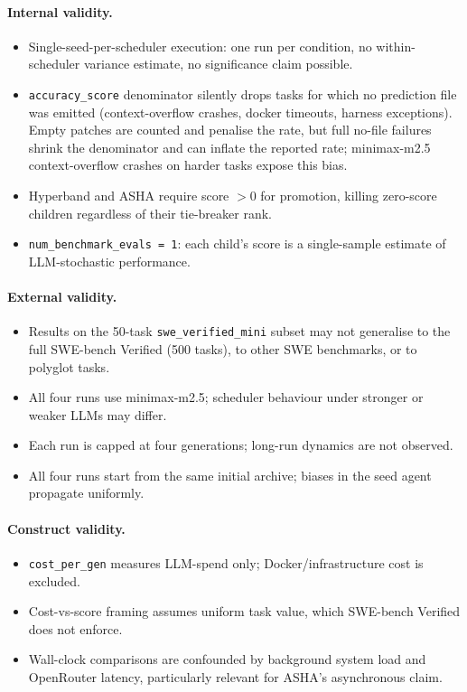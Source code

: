 \paragraph{Internal validity.}
\begin{itemize}
  \item Single-seed-per-scheduler execution: one run per condition, no
    within-scheduler variance estimate, no significance claim possible.
  \item \texttt{accuracy\_score} denominator silently drops tasks for
    which no prediction file was emitted (context-overflow crashes,
    docker timeouts, harness exceptions). Empty patches are counted
    and penalise the rate, but full no-file failures shrink the
    denominator and can inflate the reported rate; minimax-m2.5
    context-overflow crashes on harder tasks expose this bias.
  \item Hyperband and ASHA require score $> 0$ for promotion, killing
    zero-score children regardless of their tie-breaker rank.
  \item \texttt{num\_benchmark\_evals = 1}: each child's score is a
    single-sample estimate of LLM-stochastic performance.
\end{itemize}

\paragraph{External validity.}
\begin{itemize}
  \item Results on the 50-task \texttt{swe\_verified\_mini} subset may
    not generalise to the full SWE-bench Verified (500 tasks), to other
    SWE benchmarks, or to polyglot tasks.
  \item All four runs use minimax-m2.5; scheduler behaviour under
    stronger or weaker LLMs may differ.
  \item Each run is capped at four generations; long-run dynamics are
    not observed.
  \item All four runs start from the same initial archive; biases in
    the seed agent propagate uniformly.
\end{itemize}

\paragraph{Construct validity.}
\begin{itemize}
  \item \texttt{cost\_per\_gen} measures LLM-spend only;
    Docker/infrastructure cost is excluded.
  \item Cost-vs-score framing assumes uniform task value, which
    SWE-bench Verified does not enforce.
  \item Wall-clock comparisons are confounded by background system load
    and OpenRouter latency, particularly relevant for ASHA's
    asynchronous claim.
\end{itemize}
